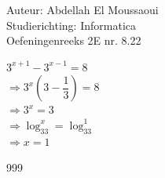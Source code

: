 \documentclass[a4paper]{article}
\begin{document}
  
\noindent \large Auteur: Abdellah El Moussaoui \\
\noindent \large Studierichting: Informatica\\
\noindent \large Oefeningenreeks 2E nr. 8.22\\

\medskip

\normalsize

$3^{x+1} - 3^{x-1} = 8$\\

$\Rightarrow3^x \left(3-\dfrac{1}{3}\right) = 8$\\

$\Rightarrow3^x = 3$\\

$\Rightarrow\log_33^x = \log_33^1$\\

$\Rightarrow \boxed{x = 1}$\\


\begin{thebibliography}{999}
\end{thebibliography}
\end{document}
